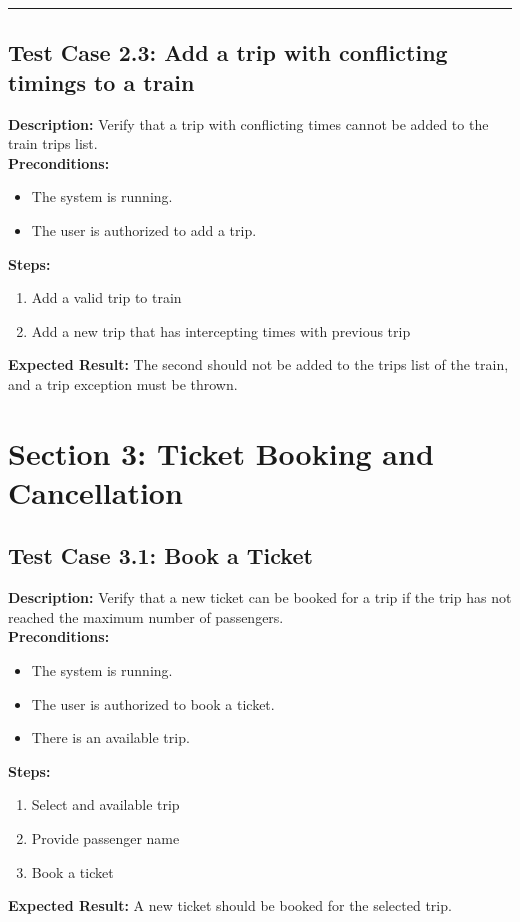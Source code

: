 \documentclass{article}
\begin{document}
\bigskip
\hrule
\bigskip

\subsection{Test Case 2.3: Add a trip with conflicting timings to a train}

\textbf{Description:} Verify that a trip with conflicting times cannot be added to the train trips list.\\
\textbf{Preconditions:}
\begin{itemize}
  \item The system is running.
  \item The user is authorized to add a trip.
\end{itemize}
\textbf{Steps:}
\begin{enumerate}
  \item Add a valid trip to train
  \item Add a new trip that has intercepting times with previous trip
\end{enumerate}
\textbf{Expected Result:} The second should not be added to the trips list of the train, and a trip exception must be thrown.

\pagebreak

\section{Section 3: Ticket Booking and Cancellation}
\bigskip
\bigskip
\subsection{Test Case 3.1: Book a Ticket}

\textbf{Description:} Verify that a new ticket can be booked for a trip if the trip has not reached the maximum number of passengers.\\
\textbf{Preconditions:}
\begin{itemize}
  \item The system is running.
  \item The user is authorized to book a ticket.
  \item There is an available trip.
\end{itemize}
\textbf{Steps:}
\begin{enumerate}
  \item Select and available trip
  \item Provide passenger name
  \item Book a ticket
\end{enumerate}
\textbf{Expected Result:}  A new ticket should be booked for the selected trip.
\end{document}
